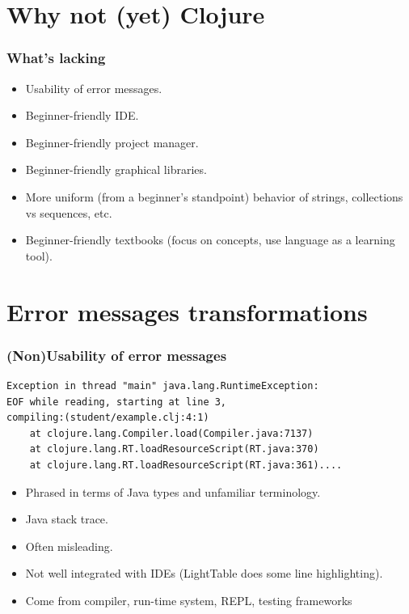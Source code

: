 \documentclass{beamer}
\begin{document}
\section{Why {\bf not} (yet) Clojure}

\begin{frame}
   \frametitle{What's lacking}
\begin{itemize}
\item Usability of error messages. %
\item Beginner-friendly IDE. 
\item Beginner-friendly project manager. 
\item Beginner-friendly graphical libraries. 
\item More uniform (from a beginner's standpoint) behavior of strings, collections vs sequences, etc.  
\item Beginner-friendly textbooks (focus on concepts, use language as a learning tool). 
\end{itemize}
\end{frame}

\section{Error messages transformations}
\begin{frame}[fragile]
   \frametitle{(Non)Usability of error messages}
\begin{verbatim}
Exception in thread "main" java.lang.RuntimeException:
EOF while reading, starting at line 3,
compiling:(student/example.clj:4:1)
	at clojure.lang.Compiler.load(Compiler.java:7137)
	at clojure.lang.RT.loadResourceScript(RT.java:370)
	at clojure.lang.RT.loadResourceScript(RT.java:361)....
\end{verbatim}
\begin{itemize}
\item Phrased in terms of Java types and unfamiliar terminology.
\item Java stack trace. 
\item Often misleading. 
\item Not well integrated with IDEs (LightTable does some line highlighting). 
\item Come from compiler, run-time system, REPL, testing frameworks %
\end{itemize}
\end{frame}
\end{document}
